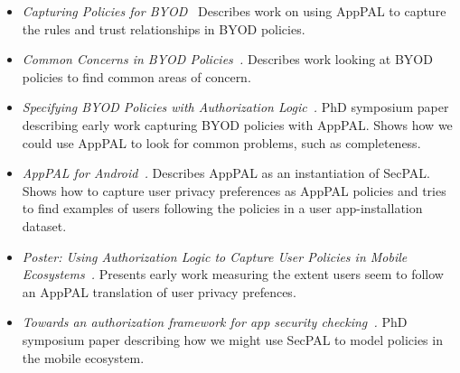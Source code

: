 \documentclass[thesis.tex]{subfiles}
\begin{document}
\begin{itemize}
\item\emph{Capturing Policies for BYOD~\cite{hallett_capturing_2017}} Describes work on using AppPAL to capture the rules and trust relationships in BYOD policies.
\item\emph{Common Concerns in BYOD Policies~\cite{hallett_common_2017}.} Describes work looking at BYOD policies to find common areas of concern.  
\item\emph{Specifying BYOD Policies with Authorization Logic~\cite{hallett_specifying_2016}.} PhD symposium paper describing early work capturing BYOD policies with AppPAL.  Shows how we could use AppPAL to look for common problems, such as completeness.
\item\emph{AppPAL for Android~\cite{hallett_apppal_2016}.} Describes AppPAL as an instantiation of SecPAL.  Shows how to capture user privacy preferences as AppPAL policies and tries to find examples of users following the policies in a user app-installation dataset.
\item\emph{Poster: Using Authorization Logic to Capture User Policies in Mobile Ecosystems~\cite{hallett_poster:_2015}.}  Presents early work measuring the extent users seem to follow an AppPAL translation of user privacy prefences.
\item\emph{Towards an authorization framework for app security checking~\cite{hallett_towards_2014}.} PhD symposium paper describing how we might use SecPAL to model policies in the mobile ecosystem.
\end{itemize}
\end{document}
